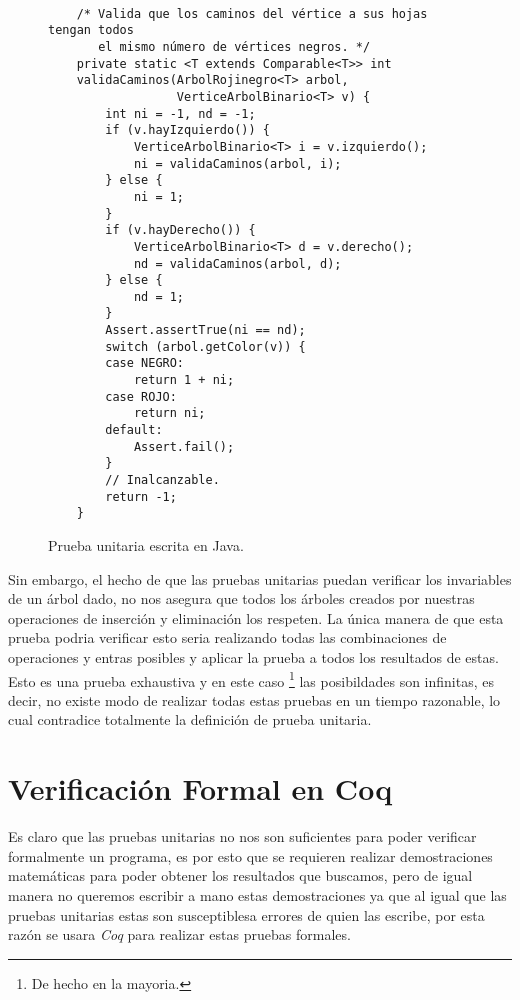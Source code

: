 \begin{figure}
\centering
\captionsetup{justification=centering}
\begin{verbatim}

    /* Valida que los caminos del vértice a sus hojas tengan todos
       el mismo número de vértices negros. */
    private static <T extends Comparable<T>> int
    validaCaminos(ArbolRojinegro<T> arbol,
                  VerticeArbolBinario<T> v) {
        int ni = -1, nd = -1;
        if (v.hayIzquierdo()) {
            VerticeArbolBinario<T> i = v.izquierdo();
            ni = validaCaminos(arbol, i);
        } else {
            ni = 1;
        }
        if (v.hayDerecho()) {
            VerticeArbolBinario<T> d = v.derecho();
            nd = validaCaminos(arbol, d);
        } else {
            nd = 1;
        }
        Assert.assertTrue(ni == nd);
        switch (arbol.getColor(v)) {
        case NEGRO:
            return 1 + ni;
        case ROJO:
            return ni;
        default:
            Assert.fail();
        }
        // Inalcanzable.
        return -1;
    }

\end{verbatim}
\caption{Prueba unitaria escrita en Java.}
\label{unitTestjava}
\end{figure}

Sin embargo, el hecho de que las pruebas unitarias puedan verificar los invariables de un \'arbol
dado, no nos asegura que todos los \'arboles creados por nuestras operaciones de inserci\'on y
eliminaci\'on los respeten. La \'unica manera de que esta prueba podria verificar esto seria
realizando todas las combinaciones de operaciones y entras posibles y aplicar la prueba a todos los
resultados de estas. Esto es una prueba exhaustiva y en este caso \footnote{De hecho en la
mayoria.} las posibildades son infinitas, es decir, no existe modo de realizar todas estas pruebas
en un tiempo razonable, lo cual contradice totalmente la definici\'on de prueba unitaria.


\section{Verificaci\'on Formal en Coq}

Es claro que las pruebas unitarias no nos son suficientes para poder verificar formalmente un
programa, es por esto que se requieren realizar demostraciones matemáticas para poder obtener los
resultados que buscamos, pero de igual manera no queremos escribir a mano estas demostraciones ya
que al igual que las pruebas unitarias estas son susceptiblesa errores de quien las escribe, por
esta raz\'on se usara \textit{Coq} para realizar estas pruebas formales.

